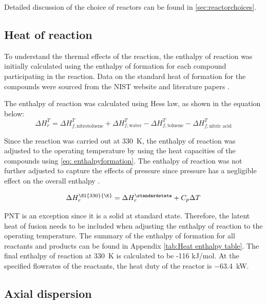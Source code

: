 Detailed discussion of the choice of reactors can be found in \cref{sec:reactorchoices}.

\subsection{Heat of reaction}
To understand the thermal effects of the reaction, the enthalpy of reaction was initially calculated using the enthalpy of formation for each compound participating in the reaction. Data on the standard heat of formation for the compounds were sourced from the NIST website and literature papers \cite{bikelyte_benchmark_2017, cox_codata_1984, di_miceli_raimondi_safety_2015, lenchitz_thermodynamic_1971, garner_heats_1921}.

The enthalpy of reaction was calculated using Hess law, as shown in the equation below:
\begin{equation}
\label{eq: enthalpyformation}
    \Delta H_{r}^{T} = \Delta H_{f,\mathrm{nitrotoluene}}^{T} + \Delta H_{f,\mathrm{water}}^{T} - \Delta H_{f,\mathrm{toluene}}^{T} - \Delta H_{f,\text{nitric acid}}^{T}
\end{equation}

Since the reaction was carried out at \SI{330}{\K}, the enthalpy of reaction was adjusted to the operating temperature by using the heat capacities of the compounds using \cref{eq: enthalpyformation}. The enthalpy of reaction was not further adjusted to capture the effects of pressure since pressure has a negligible effect on the overall enthalpy \cite{liu_nitration_2019}. 

\begin{equation}
    \Delta H_{r}^{\SI{330}{\K}} = \Delta H_{r}^{\standardstate} + C_p \Delta T
\end{equation}

PNT is an exception since it is a solid at standard state. Therefore, the latent heat of fusion needs to be included when adjusting the enthalpy of reaction to the operating temperature. The summary of the enthalpy of formation for all reactants and products can be found in Appendix \ref{tab:Heat enthalpy table}. The final enthalpy of reaction at \SI{330}{\K} is calculated to be -116 kJ/mol. At the specified flowrates of the reactants, the heat duty of the reactor is \SI{-63.4}{\kW}.

\subsection{Axial dispersion}
\label{sec:axialdispersion}

